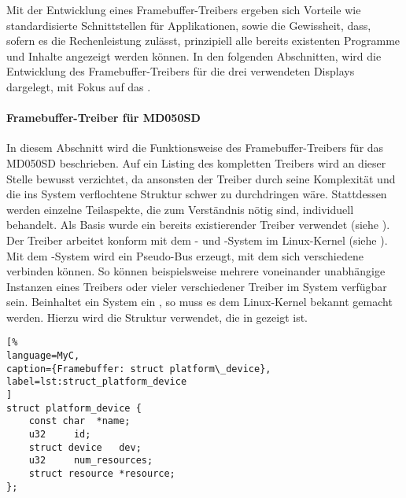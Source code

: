 Mit der Entwicklung eines Framebuffer-Treibers ergeben sich Vorteile wie standardisierte Schnittstellen für Applikationen, sowie die Gewissheit, dass, sofern es die Rechenleistung zulässt, prinzipiell alle bereits existenten Programme und Inhalte angezeigt werden können.
In den folgenden Abschnitten, wird die Entwicklung des Framebuffer-Treibers für die drei verwendeten Displays dargelegt, mit Fokus auf das . 
\paragraph{Framebuffer-Treiber für MD050SD}
\label{cha:framebuffer}
In diesem Abschnitt wird die Funktionsweise des Framebuffer-Treibers für das MD050SD beschrieben. Auf ein Listing des kompletten Treibers wird an dieser Stelle bewusst verzichtet, da ansonsten der Treiber durch seine Komplexität und die ins System verflochtene Struktur schwer zu durchdringen wäre. Stattdessen werden einzelne Teilaspekte, die zum Verständnis nötig sind, individuell behandelt. Als Basis wurde ein bereits existierender Treiber verwendet (siehe \cite{Schlegel2013c}).\\
Der Treiber arbeitet konform mit dem - und -System im Linux-Kernel (siehe \cite{LinuxKernelPlatformDeviceDriver}). Mit dem -System wird ein Pseudo-Bus erzeugt, mit dem sich verschiedene  verbinden können. So können beispielsweise mehrere voneinander unabhängige Instanzen eines Treibers oder vieler verschiedener Treiber im System verfügbar sein. Beinhaltet ein System ein , so muss es dem Linux-Kernel bekannt gemacht werden. Hierzu wird die Struktur  verwendet, die in  gezeigt ist.
\begin{lstlisting}[%
language=MyC,
caption={Framebuffer: struct platform\_device},
label=lst:struct_platform_device
]
struct platform_device {
	const char	*name;
	u32		id;
	struct device	dev;
	u32		num_resources;
	struct resource	*resource;
};
\end{lstlisting}

